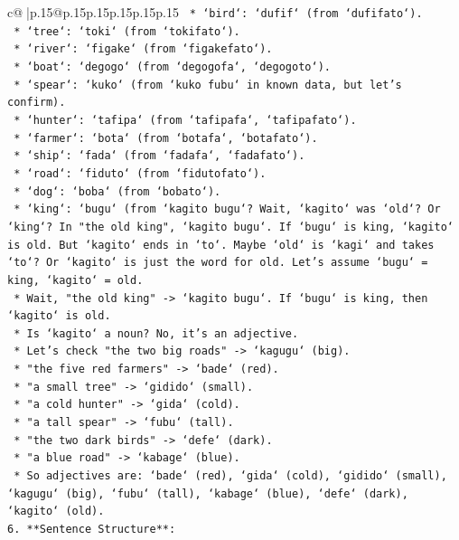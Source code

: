 \documentclass{article}
\begin{document}
{\begin{supertabular}{c@{$\;$}|p{.15\linewidth}@{}p{.15\linewidth}p{.15\linewidth}p{.15\linewidth}p{.15\linewidth}p{.15\linewidth}}
{{{\texttt{    *   `bird`: `dufif` (from `dufifato`).} \\
\texttt{    *   `tree`: `toki` (from `tokifato`).} \\
\texttt{    *   `river`: `figake` (from `figakefato`).} \\
\texttt{    *   `boat`: `degogo` (from `degogofa`, `degogoto`).} \\
\texttt{    *   `spear`: `kuko` (from `kuko fubu` in known data, but let's confirm).} \\
\texttt{    *   `hunter`: `tafipa` (from `tafipafa`, `tafipafato`).} \\
\texttt{    *   `farmer`: `bota` (from `botafa`, `botafato`).} \\
\texttt{    *   `ship`: `fada` (from `fadafa`, `fadafato`).} \\
\texttt{    *   `road`: `fiduto` (from `fidutofato`).} \\
\texttt{    *   `dog`: `boba` (from `bobato`).} \\
\texttt{    *   `king`: `bugu` (from `kagito bugu`? Wait, `kagito` was `old`? Or `king`? In "the old king", `kagito bugu`. If `bugu` is king, `kagito` is old. But `kagito` ends in `to`. Maybe `old` is `kagi` and takes `to`? Or `kagito` is just the word for old. Let's assume `bugu` = king, `kagito` = old.} \\
\texttt{    *   Wait, "the old king" {-}> `kagito bugu`. If `bugu` is king, then `kagito` is old.} \\
\texttt{    *   Is `kagito` a noun? No, it's an adjective.} \\
\texttt{    *   Let's check "the two big roads" {-}> `kagugu` (big).} \\
\texttt{    *   "the five red farmers" {-}> `bade` (red).} \\
\texttt{    *   "a small tree" {-}> `gidido` (small).} \\
\texttt{    *   "a cold hunter" {-}> `gida` (cold).} \\
\texttt{    *   "a tall spear" {-}> `fubu` (tall).} \\
\texttt{    *   "the two dark birds" {-}> `defe` (dark).} \\
\texttt{    *   "a blue road" {-}> `kabage` (blue).} \\
\texttt{    *   So adjectives are: `bade` (red), `gida` (cold), `gidido` (small), `kagugu` (big), `fubu` (tall), `kabage` (blue), `defe` (dark), `kagito` (old).} \\
\texttt{6.  **Sentence Structure**:} \\
}}}
\end{supertabular}}
\end{document}
